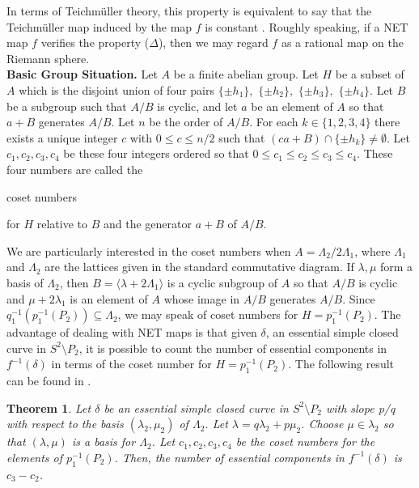 \documentclass[article,dvisp]{amsart}
\newtheorem{thm}{Theorem}[section]
\theoremstyle{definition}
\theoremstyle{remark}
\numberwithin{equation}{section}
\theoremstyle{lemma}
\begin{document}
In terms of Teichm\"uller theory, this property is equivalent to say that the Teichm\"uller map induced by the map $f$ is constant \cite{BEKP}. Roughly speaking, if a NET map $f$ verifies the property ($\Delta$), then we may regard $f$ as a rational map on the Riemann sphere.\vspace{.1in}\\
\textbf{Basic Group Situation.} Let $A$ be a finite abelian group. Let $H$ be a subset of $A$ which is the disjoint union of four pairs $\{\pm h_{1}\},$ $\{\pm h_{2}\},$ $\{\pm h_{3}\},$ $\{\pm h_{4}\}$. Let $B$ be a subgroup such that $A/B$ is cyclic, and let $a$ be an element of $A$ so that $a+B$ generates $A/B$. Let $n$ be the order of $A/B$. For each $k\in\{1,2,3,4\}$ there exists a unique integer $c$ with $0\leq c\leq n/2$ such that $(ca+B)\cap\{\pm h_{k}\}\neq\emptyset$.
Let $c_{1},c_{2},c_{3},c_{4}$ be these four integers ordered so that $0\leq c_{1}\leq c_{2}\leq c_{3}\leq c_{4}$. These four numbers are called the \begin{em}coset numbers\end{em} for $H$ relative to $B$ and the generator $a+B$ of $A/B$.

We are particularly interested in the coset numbers when $A=\Lambda_{2}/2\Lambda_{1}$, where $\Lambda_{1}$ and $\Lambda_{2}$ are the lattices given in the standard commutative diagram. If $\lambda, \mu$ form a basis of $\Lambda_{2}$, then $B=\langle \lambda+2\Lambda_{1}\rangle$ is a cyclic subgroup of $A$ so that $A/B$ is cyclic and $\mu+2\lambda_{1}$ is an element of $A$ whose image in $A/B$ generates $A/B$. Since $q^{-1}_{1}(p^{-1}_{1}(P_{2}))\subseteq \Lambda_{2}$, we may speak of coset numbers for $H=p^{-1}_{1}(P_{2})$. The advantage of dealing with NET maps is that given $\delta$, an essential simple closed curve in $S^{2}\setminus P_{2}$, it is possible to count the number of essential components in $f^{-1}(\delta)$ in terms of the coset number for $H=p_{1}^{-1}(P_{2})$. The following result can be found in \cite{CFPP}.

\begin{thm}\label{teo:2} Let $\delta$ be an essential simple closed curve in $S^{2}\setminus P_{2}$ with slope p/q with respect to the basis $(\lambda_{2},\mu_{2})$ of $\Lambda_{2}$. Let $\lambda=q\lambda_{2}+p\mu_{2}$. Choose $\mu\in\lambda_{2}$ so that $(\lambda, \mu)$ is a basis for $\Lambda_{2}$. Let $c_{1},c_{2},c_{3},c_{4}$ be the coset numbers for the elements of $p^{-1}_{1}(P_{2})$. Then, the number of essential components in $f^{-1}(\delta)$ is $c_{3}-c_{2}$.\end{thm}
\end{document}
